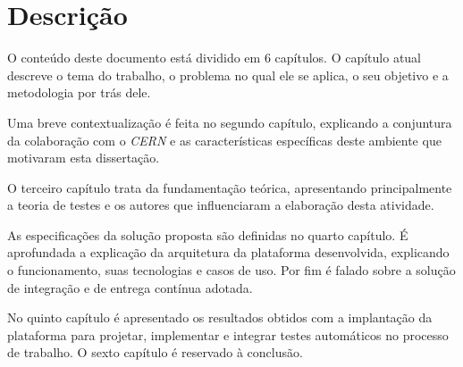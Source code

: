 \section{Descrição}
O conteúdo deste documento está dividido em 6 capítulos. O capítulo atual descreve o tema do trabalho, o problema no qual ele se aplica, o seu objetivo e a metodologia por trás dele.

Uma breve contextualização é feita no segundo capítulo, explicando a conjuntura da colaboração com o \emph{CERN} e as características específicas deste ambiente que motivaram esta dissertação.

O terceiro capítulo trata da fundamentação teórica, apresentando principalmente a teoria de testes e os autores que influenciaram a elaboração desta atividade.

As especificações da solução proposta são definidas no quarto capítulo. É aprofundada a explicação da arquitetura da plataforma desenvolvida, explicando o funcionamento, suas tecnologias e casos de uso. Por fim é falado sobre a solução de integração e de entrega contínua adotada.

No quinto capítulo é apresentado os resultados obtidos com a implantação da plataforma para projetar, implementar e integrar testes automáticos no processo de trabalho. O sexto capítulo é reservado à conclusão.
